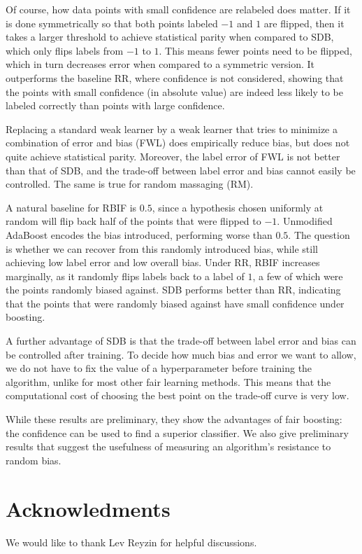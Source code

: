 \documentclass{article}
\begin{document}
Of course, how data points with small confidence are relabeled does matter.  If it
is done symmetrically so that both points labeled $-1$ and $1$ are flipped,
then it takes a larger threshold to achieve statistical parity when compared to
SDB, which only flips labels from $-1$ to $1$.  This means fewer points need to
be flipped, which in turn decreases error when compared to a symmetric version.
It outperforms the baseline RR, where confidence is not considered, showing that
the points with small confidence (in absolute value) are indeed less likely to be
labeled correctly than points with large confidence.

Replacing a standard weak learner by a weak learner that tries to minimize a
combination of error and bias (FWL) does empirically reduce bias, but does not
quite achieve statistical parity. Moreover, the label error of FWL is not
better than that of SDB, and the trade-off between label error and bias cannot
easily be controlled. The same is true for random massaging (RM).

A natural baseline for RBIF is $0.5$, since a hypothesis chosen uniformly at
random will flip back half of the points that were flipped to $-1$.  Unmodified
AdaBoost encodes the bias introduced, performing worse than $0.5$.  The
question is whether we can recover from this randomly introduced bias, while
still achieving low label error and low overall bias.  Under RR, RBIF increases
marginally, as it randomly flips labels back to a label of $1$, a few of which
were the points randomly biased against.  SDB performs better than RR,
indicating that the points that were randomly biased against have small confidence
under boosting.

A further advantage of SDB is that the trade-off between label error and bias
can be controlled after training.  To decide how much bias and error we want to
allow, we do not have to fix the value of a hyperparameter before training the
algorithm, unlike for most other fair learning methods. This means that the
computational cost of choosing the best point on the trade-off curve is very
low.

While these results are preliminary, they show the advantages of fair boosting:
the confidence can be used to find a superior classifier.  We also give preliminary
results that suggest the usefulness of measuring an algorithm's resistance to
random bias.

\section*{Acknowledments}
We would like to thank Lev Reyzin for helpful discussions.

\newpage


\end{document}
